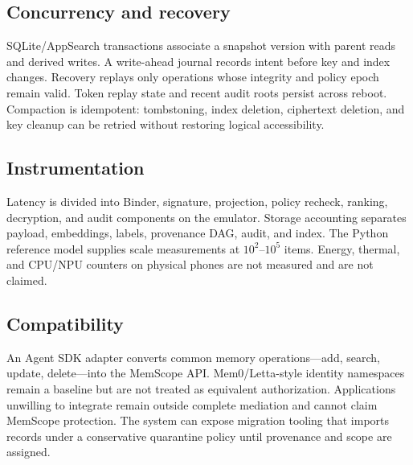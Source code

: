 \subsection{Concurrency and recovery}

SQLite/AppSearch transactions associate a snapshot version with parent reads and derived writes. A write-ahead journal records intent before key and index changes. Recovery replays only operations whose integrity and policy epoch remain valid. Token replay state and recent audit roots persist across reboot. Compaction is idempotent: tombstoning, index deletion, ciphertext deletion, and key cleanup can be retried without restoring logical accessibility.

\subsection{Instrumentation}

Latency is divided into Binder, signature, projection, policy recheck, ranking, decryption, and audit components on the emulator. Storage accounting separates payload, embeddings, labels, provenance DAG, audit, and index. The Python reference model supplies scale measurements at $10^2$--$10^5$ items. Energy, thermal, and CPU/NPU counters on physical phones are not measured and are not claimed.

\subsection{Compatibility}

An Agent SDK adapter converts common memory operations---add, search, update, delete---into the MemScope API. Mem0/Letta-style identity namespaces remain a baseline but are not treated as equivalent authorization. Applications unwilling to integrate remain outside complete mediation and cannot claim MemScope protection. The system can expose migration tooling that imports records under a conservative quarantine policy until provenance and scope are assigned.
